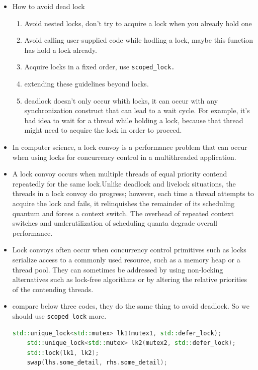 \documentclass[a4paper,11pt,twoside]{book}
\begin{document}
\begin{itemize}
	
	\item How to avoid dead lock
	\begin{enumerate}
		\item Avoid nested locks, don't try to acquire a lock when you already hold one
		\item Avoid calling user-supplied code while hodling a lock, maybe this function has hold a lock already.
		\item Acquire locks in a fixed order, use \texttt{scoped\_lock.}
		\item extending these guidelines beyond locks. 
		\item deadlock doesn't only occur whith locks, it can occur with any synchronization construct that can lead to a wait cycle. For example, it's bad idea to wait for a thread while holding a lock, because that thread might need to acquire the lock in order to proceed. 
	\end{enumerate}	
	
	\item In computer science, a lock convoy is a performance problem that can occur when using locks for concurrency control in a multithreaded application.
	
	\item A lock convoy occurs when multiple threads of equal priority contend repeatedly for the same lock.Unlike deadlock and livelock situations, the threads in a lock convoy do progress; however, each time a thread attempts to acquire the lock and fails, it relinquishes the remainder of its scheduling quantum and forces a context switch. The overhead of repeated context switches and underutilization of scheduling quanta degrade overall performance.
	
	\item Lock convoys often occur when concurrency control primitives such as locks serialize access to a commonly used resource, such as a memory heap or a thread pool. They can sometimes be addressed by using non-locking alternatives such as lock-free algorithms or by altering the relative priorities of the contending threads.
	
	\item compare below three codes, they do the same thing to avoid deadlock. So we should use \texttt{scoped\_lock} more. 
\begin{lstlisting}[frame=single, language=c++]
	std::unique_lock<std::mutex> lk1(mutex1, std::defer_lock);
	std::unique_lock<std::mutex> lk2(mutex2, std::defer_lock);
	std::lock(lk1, lk2);	
	swap(lhs.some_detail, rhs.some_detail);
\end{lstlisting}


\end{itemize}
\end{document}
